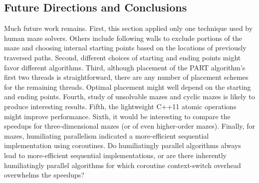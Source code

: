 \subsection{Future Directions and Conclusions}
\label{sec:SMPdesign:Future Directions and Conclusions}

Much future work remains.
First, this section applied only one technique used by human maze solvers.
Others include following walls to exclude portions of the maze
and choosing internal starting points based on the
locations of previously traversed paths.
Second, different choices of
starting and ending points might favor different algorithms.
Third, although placement of the PART algorithm's
first two threads is straightforward, there are any number of
placement schemes for the remaining threads.
Optimal placement might well depend on the starting and ending points.
Fourth, study of unsolvable mazes and cyclic mazes
is likely to produce interesting results.
Fifth, the lightweight C++11 atomic operations might improve performance.
Sixth, it would be interesting to compare the speedups for
three-dimensional mazes (or of even higher-order mazes).
Finally, for mazes, humiliating parallelism indicated a
more-efficient sequential implementation using coroutines.
Do humiliatingly parallel algorithms always lead to more-efficient
sequential implementations, or are there inherently humiliatingly parallel
algorithms for which coroutine context-switch overhead overwhelms the
speedups?

